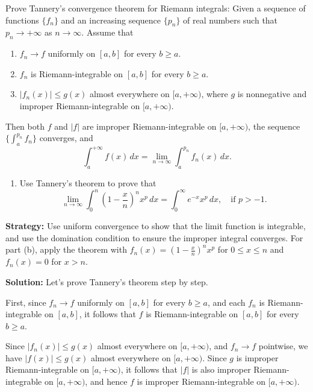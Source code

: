 \begin{problembox}
Prove Tannery's convergence theorem for Riemann integrals: Given a sequence of functions $\{f_n\}$ and an increasing sequence $\{p_n\}$ of real numbers such that $p_n \to +\infty$ as $n \to \infty$. Assume that
\begin{enumerate}[label=(\alph*)]
\item $f_n \to f$ uniformly on $[a,b]$ for every $b \geq a$.
\item $f_n$ is Riemann-integrable on $[a,b]$ for every $b \geq a$.
\item $|f_n(x)| \leq g(x)$ almost everywhere on $[a,+\infty)$, where $g$ is nonnegative and improper Riemann-integrable on $[a,+\infty)$.
\end{enumerate}
Then both $f$ and $|f|$ are improper Riemann-integrable on $[a,+\infty)$, the sequence $\{\int_a^{p_n} f_n\}$ converges, and
\[\int_{a}^{+\infty} f(x) \, dx = \lim_{n \to \infty} \int_{a}^{p_n} f_n(x) \, dx.\]

\begin{enumerate}[label=(\alph*),resume]
\item Use Tannery's theorem to prove that
\[\lim_{n \to \infty} \int_{0}^{n} \left( 1 - \frac{x}{n} \right)^n x^p \, dx = \int_{0}^{\infty} e^{-x}x^p \, dx, \quad \text{if } p > -1.\]
\end{enumerate}
\end{problembox}

\noindent\textbf{Strategy:} Use uniform convergence to show that the limit function is integrable, and use the domination condition to ensure the improper integral converges. For part (b), apply the theorem with $f_n(x) = (1 - \frac{x}{n})^n x^p$ for $0 \leq x \leq n$ and $f_n(x) = 0$ for $x > n$.

\bigskip\noindent\textbf{Solution:}
Let's prove Tannery's theorem step by step.

First, since $f_n \to f$ uniformly on $[a,b]$ for every $b \geq a$, and each $f_n$ is Riemann-integrable on $[a,b]$, it follows that $f$ is Riemann-integrable on $[a,b]$ for every $b \geq a$.

Since $|f_n(x)| \leq g(x)$ almost everywhere on $[a,+\infty)$, and $f_n \to f$ pointwise, we have $|f(x)| \leq g(x)$ almost everywhere on $[a,+\infty)$. Since $g$ is improper Riemann-integrable on $[a,+\infty)$, it follows that $|f|$ is also improper Riemann-integrable on $[a,+\infty)$, and hence $f$ is improper Riemann-integrable on $[a,+\infty)$.

